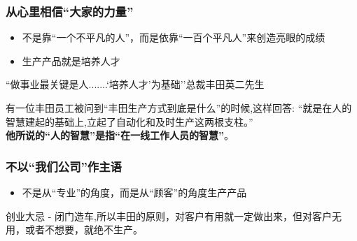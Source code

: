\hypertarget{ux4eceux5fc3ux91ccux76f8ux4fe1ux5927ux5bb6ux7684ux529bux91cf}{%
\subsubsection{从心里相信``大家的力量''}\label{ux4eceux5fc3ux91ccux76f8ux4fe1ux5927ux5bb6ux7684ux529bux91cf}}

\begin{itemize}
\tightlist
\item
  不是靠``一个不平凡的人''，而是依靠``一百个平凡人''来创造亮眼的成绩
\item
  生产产品就是培养人才
\end{itemize}

\begin{description}
\tightlist
\item[]
``做事业最关键是人.......`培养人才'为基础''总裁丰田英二先生
\end{description}

\begin{description}
\tightlist
\item[]
有一位丰田员工被问到``丰田生产方式到底是什么''的时候,这样回答:
``就是在人的智慧建起的基础上,立起了自动化和及时生产这两根支柱。''\\

\textbf{他所说的``人的智慧''是指``在一线工作人员的智慧''}。\\
\end{description}

\hypertarget{ux4e0dux4ee5ux6211ux4eecux516cux53f8ux4f5cux4e3bux8bed}{%
\subsubsection{不以``我们公司''作主语}\label{ux4e0dux4ee5ux6211ux4eecux516cux53f8ux4f5cux4e3bux8bed}}

\begin{itemize}
\tightlist
\item
  不是从``专业''的角度，而是从``顾客''的角度生产产品
\end{itemize}

\begin{description}
\tightlist
\item[]
创业大忌 -
闭门造车,所以丰田的原则，对客户有用就一定做出来，但对客户无用，或者不想要，就绝不生产。\\
\end{description}


